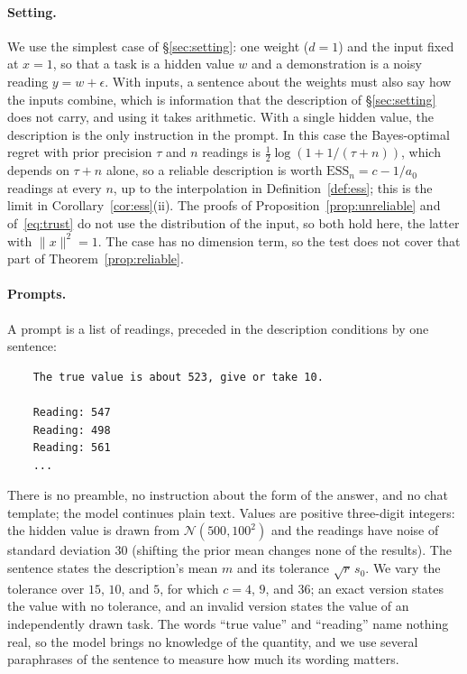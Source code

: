 \documentclass[10pt]{article}
\newcommand{\ess}{\mathrm{ESS}}
\begin{document}
\paragraph{Setting.} We use the simplest case of \S\ref{sec:setting}: one weight ($d = 1$) and the input fixed at $x = 1$, so that a task is a hidden value $w$ and a demonstration is a noisy reading $y = w + \epsilon$. With inputs, a sentence about the weights must also say how the inputs combine, which is information that the description of \S\ref{sec:setting} does not carry, and using it takes arithmetic. With a single hidden value, the description is the only instruction in the prompt. In this case the Bayes-optimal regret with prior precision $\tau$ and $n$ readings is $\tfrac12 \log(1 + 1/(\tau + n))$, which depends on $\tau + n$ alone, so a reliable description is worth $\ess_n = c - 1/a_0$ readings at every $n$, up to the interpolation in Definition~\ref{def:ess}; this is the limit in Corollary~\ref{cor:ess}(ii). The proofs of Proposition~\ref{prop:unreliable} and of~\eqref{eq:trust} do not use the distribution of the input, so both hold here, the latter with $\|x\|^2 = 1$. The case has no dimension term, so the test does not cover that part of Theorem~\ref{prop:reliable}.

\paragraph{Prompts.} A prompt is a list of readings, preceded in the description conditions by one sentence:

\smallskip\noindent\begin{minipage}{\linewidth}
\begin{verbatim}
    The true value is about 523, give or take 10.

    Reading: 547
    Reading: 498
    Reading: 561
    ...
\end{verbatim}
\end{minipage}
\smallskip

\noindent There is no preamble, no instruction about the form of the answer, and no chat template; the model continues plain text. Values are positive three-digit integers: the hidden value is drawn from $\mathcal{N}(500, 100^2)$ and the readings have noise of standard deviation $30$ (shifting the prior mean changes none of the results). The sentence states the description's mean $m$ and its tolerance $\sqrt{r}\,s_0$. We vary the tolerance over $15$, $10$, and $5$, for which $c = 4$, $9$, and $36$; an exact version states the value with no tolerance, and an invalid version states the value of an independently drawn task. The words ``true value'' and ``reading'' name nothing real, so the model brings no knowledge of the quantity, and we use several paraphrases of the sentence to measure how much its wording matters.
\end{document}
